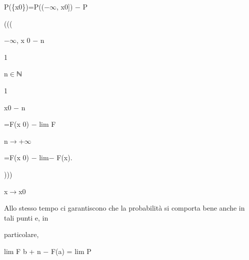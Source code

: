 \documentclass[a4paper,portrait,12pt]{article}
\begin{document}
\begin{flushleft}
P(\{x0\})=P(($-$$\infty$, x0]) $-$ P
\end{flushleft}





(((





\begin{flushleft}
$-$$\infty$, x 0 $-$ n
\end{flushleft}


1





\begin{flushleft}
n$\in$ℕ
\end{flushleft}


1


\begin{flushleft}
x0 $-$ n
\end{flushleft}





\begin{flushleft}
=F(x 0) $-$ lim F
\end{flushleft}


\begin{flushleft}
n$\rightarrow$+$\infty$
\end{flushleft}


\begin{flushleft}
=F(x 0) $-$ lim$-$ F(x).
\end{flushleft}





)))





\begin{flushleft}
x$\rightarrow$x0
\end{flushleft}





\begin{flushleft}
Allo stesso tempo ci garantiscono che la probabilit\`{a} si comporta bene anche in tali punti e, in
\end{flushleft}


\begin{flushleft}
particolare,
\end{flushleft}


\begin{flushleft}
lim F b + n $-$ F(a) = lim P
\end{flushleft}
\end{document}
